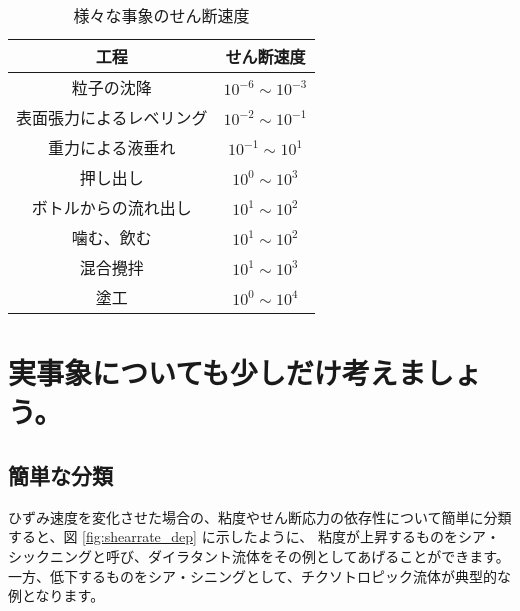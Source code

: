 \documentclass[uplatex,dvipdfmx,a4paper,11pt]{jsreport}
\begin{document}
\begin{table}[htb]
	\caption{様々な事象のせん断速度}
	\begin{center}
		\begin{tabular}{c|c} \hline
			工程 & せん断速度 \\ \hline \hline
			粒子の沈降	& $10^{-6} \sim 10^{-3}$ \\ \hline
			表面張力によるレベリング	& $10^{-2} \sim 10^{-1}$ \\ \hline
			重力による液垂れ	& $10^{-1} \sim 10^{1}$ \\ \hline \hline
			押し出し	& $10^{0} \sim 10^{3}$ \\ \hline
			ボトルからの流れ出し	& $10^{1} \sim 10^{2}$ \\ \hline
			噛む、飲む	& $10^{1} \sim 10^{2}$ \\ \hline
			混合攪拌	& $10^{1} \sim 10^{3}$ \\ \hline
			塗工	& $10^{0} \sim 10^{4}$ \\ \hline
		\end{tabular}
	\end{center}
\end{table}


\section{実事象についても少しだけ考えましょう。}
\subsection{簡単な分類}

ひずみ速度を変化させた場合の、粘度やせん断応力の依存性について簡単に分類すると、図 \ref{fig:shearrate_dep} に示したように、
粘度が上昇するものをシア・シックニングと呼び、ダイラタント流体をその例としてあげることができます。
一方、低下するものをシア・シニングとして、チクソトロピック流体が典型的な例となります。
\end{document}

